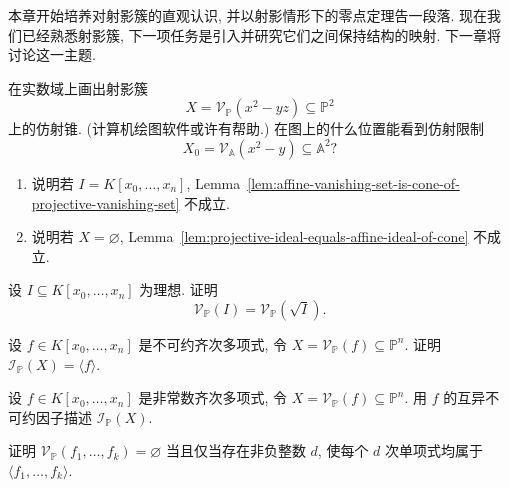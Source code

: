 本章开始培养对射影簇的直观认识, 并以射影情形下的零点定理告一段落. 现在我们已经熟悉射影簇, 下一项任务是引入并研究它们之间保持结构的映射. 下一章将讨论这一主题.

\BookExerciseHeading
\begin{BookExercises}
  \item\label{ex:real-affine-cone-over-projective-conic} 在实数域上画出射影簇
  \[
    X=\mathcal{V}_{\mathbb{P}}(x^{2}-yz)\subseteq\mathbb{P}^{2}
  \]
  上的仿射锥. (计算机绘图软件或许有帮助.) 在图上的什么位置能看到仿射限制
  \[
    X_{0}=\mathcal{V}_{\mathbb{A}}(x^{2}-y)\subseteq\mathbb{A}^{2}?
  \]
  \item\label{ex:necessity-of-affine-cone-lemma-hypotheses}
  \begin{enumerate}
    \item 说明若 $I=K[x_{0},\ldots,x_{n}]$, Lemma~\ref{lem:affine-vanishing-set-is-cone-of-projective-vanishing-set} 不成立.
    \item 说明若 $X=\varnothing$, Lemma~\ref{lem:projective-ideal-equals-affine-ideal-of-cone} 不成立.
  \end{enumerate}
  \item\label{ex:projective-vanishing-set-invariant-under-radical} 设 $I\subseteq K[x_{0},\ldots,x_{n}]$ 为理想. 证明
  \[
    \mathcal{V}_{\mathbb{P}}(I)=\mathcal{V}_{\mathbb{P}}(\sqrt I).
  \]
  \item\label{ex:projective-vanishing-ideal-of-irreducible-polynomial} 设 $f\in K[x_{0},\ldots,x_{n}]$ 是不可约齐次多项式, 令 $X=\mathcal{V}_{\mathbb{P}}(f)\subseteq\mathbb{P}^{n}$. 证明 $\mathcal{I}_{\mathbb{P}}(X)=\langle f\rangle$.
  \item\label{ex:projective-vanishing-ideal-via-distinct-irreducible-factors} 设 $f\in K[x_{0},\ldots,x_{n}]$ 是非常数齐次多项式, 令 $X=\mathcal{V}_{\mathbb{P}}(f)\subseteq\mathbb{P}^{n}$. 用 $f$ 的互异不可约因子描述 $\mathcal{I}_{\mathbb{P}}(X)$.
  \item\label{ex:empty-projective-variety-criterion-by-degree} 证明 $\mathcal{V}_{\mathbb{P}}(f_{1},\ldots,f_{k})=\varnothing$ 当且仅当存在非负整数 $d$, 使每个 $d$ 次单项式均属于 $\langle f_{1},\ldots,f_{k}\rangle$.
\end{BookExercises}
